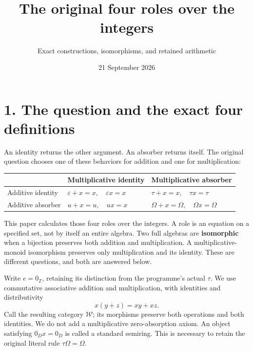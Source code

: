 \documentclass[
]{article}
\title{The original four roles over the integers}
\subtitle{Exact constructions, isomorphisms, and retained arithmetic}
\author{}
\date{21 September 2026}
\newcounter{none} %
\begin{document}
\maketitle

{
\setcounter{tocdepth}{3}
\tableofcontents
}
\section{1. The question and the exact four
definitions}\label{the-question-and-the-exact-four-definitions}

An identity returns the other argument. An absorber returns itself. The
original question chooses one of these behaviors for addition and one
for multiplication:

{\def\LTcaptype{none} %
\begin{longtable}[]{@{}
  >{\raggedright\arraybackslash}p{}
  >{\raggedright\arraybackslash}p{}
  >{\raggedright\arraybackslash}p{}@{}}
\toprule\noalign{}
\begin{minipage}[b]{\linewidth}\raggedright
\end{minipage} & \begin{minipage}[b]{\linewidth}\raggedright
Multiplicative identity
\end{minipage} & \begin{minipage}[b]{\linewidth}\raggedright
Multiplicative absorber
\end{minipage} \\
\midrule\noalign{}
\endhead
\bottomrule\noalign{}
\endlastfoot
Additive identity & \(\varepsilon+x=x,\quad\varepsilon x=x\) &
\(\tau+x=x,\quad\tau x=\tau\) \\
Additive absorber & \(u+x=u,\quad ux=x\) &
\(\Omega+x=\Omega,\quad\Omega x=\Omega\) \\
\end{longtable}
}

This paper calculates those four roles over the integers. A role is an
equation on a specified set, not by itself an entire algebra. Two full
algebras are \textbf{isomorphic} when a bijection preserves both
addition and multiplication. A multiplicative-monoid isomorphism
preserves only multiplication and its identity. These are different
questions, and both are answered below.

Write \(e=0_{\mathbb Z}\), retaining its distinction from the
programme's actual \(\tau\). We use commutative associative addition and
multiplication, with identities and distributivity \[
x(y+z)=xy+xz.
\] Call the resulting category \(\mathcal W\); its morphisms preserve
both operations and both identities. We do not add a multiplicative
zero-absorption axiom. An object satisfying \(0_Dx=0_D\) is called a
standard semiring. This is necessary to retain the original literal rule
\(\tau\Omega=\Omega\).
\end{document}
